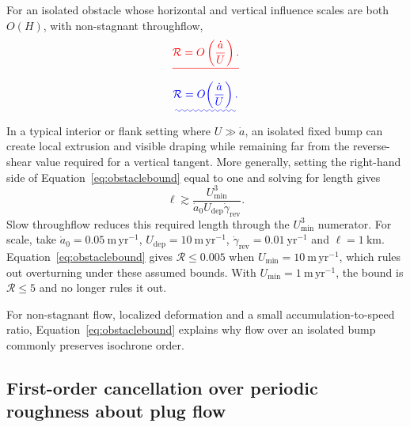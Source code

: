 \documentclass[review]{igs}
\providecommand{\DIFadd}[1]{{\protect\color{blue}\uwave{#1}}} %
\providecommand{\DIFdel}[1]{{\protect\color{red}\sout{#1}}}                      %
\providecommand{\DIFaddbegin}{} %
\providecommand{\DIFaddend}{} %
\providecommand{\DIFdelbegin}{} %
\providecommand{\DIFdelend}{} %
\newcommand{\DIFscaledelfig}{0.5}
\newlength{\DIFdelgraphicswidth} %
\newlength{\DIFdelgraphicsheight} %
\newcommand{\DIFaddincludegraphics}[2][]{{\color{blue}\fbox{\DIFOincludegraphics[#1]{#2}}}} %
\newcommand{\DIFdelincludegraphics}[2][]{%
\sbox{\DIFdelgraphicsbox}{\DIFOincludegraphics[#1]{#2}}%
\settoboxwidth{\DIFdelgraphicswidth}{\DIFdelgraphicsbox} %
\settoboxtotalheight{\DIFdelgraphicsheight}{\DIFdelgraphicsbox} %
\scalebox{\DIFscaledelfig}{%
\parbox[b]{\DIFdelgraphicswidth}{\usebox{\DIFdelgraphicsbox}\\[-\baselineskip] \rule{\DIFdelgraphicswidth}{0em}}\llap{\resizebox{\DIFdelgraphicswidth}{\DIFdelgraphicsheight}{%
\setlength{\unitlength}{\DIFdelgraphicswidth}%
\begin{picture}(1,1)%
\thicklines\linethickness{2pt} %
{\color[rgb]{1,0,0}\put(0,0){\framebox(1,1){}}}%
{\color[rgb]{1,0,0}\put(0,0){\line( 1,1){1}}}%
{\color[rgb]{1,0,0}\put(0,1){\line(1,-1){1}}}%
\end{picture}%
}\hspace*{3pt}}} %
} %
\DeclareRobustCommand{\DIFaddbegin}{\DIFOaddbegin \let\includegraphics\DIFaddincludegraphics} %
\DeclareRobustCommand{\DIFaddend}{\DIFOaddend \let\includegraphics\DIFOincludegraphics} %
\DeclareRobustCommand{\DIFdelbegin}{\DIFOdelbegin \let\includegraphics\DIFdelincludegraphics} %
\DeclareRobustCommand{\DIFdelend}{\DIFOaddend \let\includegraphics\DIFOincludegraphics} %
\begin{document}
For an isolated obstacle whose horizontal and vertical influence scales are both \(O(H)\), with non-stagnant throughflow,
\DIFdelbegin \begin{displaymath}
\DIFdel{\mathcal{R}=O\left(\frac{\dot a}{U}\right).
}\end{displaymath}%
\DIFdelend \DIFaddbegin \begin{equation}
\DIFadd{\mathcal{R}=O\!\left(\frac{\dot a}{U}\right).
\label{eq:isolatedscale}
}\end{equation}\DIFaddend 
In a typical interior or flank setting where \(U\gg\dot a\), an isolated fixed bump can create local extrusion and visible draping while remaining far from the reverse-shear value required for a vertical tangent. More generally, setting the right-hand side of Equation~\ref{eq:obstaclebound} equal to one and solving for length gives
\begin{equation}
\ell
\gtrsim
\frac{U_{\min}^{3}}{\dot a_0U_{\mathrm{dep}}\dot\gamma_{\mathrm{rev}}}.
\label{eq:lengththreshold}
\end{equation}
Slow throughflow reduces this required length through the \(U_{\min}^{3}\) numerator. For scale, take \(\dot a_0=0.05~\mathrm{m\,yr^{-1}}\), \(U_{\mathrm{dep}}=10~\mathrm{m\,yr^{-1}}\), \(\dot\gamma_{\mathrm{rev}}=0.01~\mathrm{yr^{-1}}\) and \(\ell=1~\mathrm{km}\). Equation~\ref{eq:obstaclebound} gives \(\mathcal{R}\leq0.005\) when \(U_{\min}=10~\mathrm{m\,yr^{-1}}\), which rules out overturning under these assumed bounds. With \(U_{\min}=1~\mathrm{m\,yr^{-1}}\), the bound is \(\mathcal{R}\leq5\) and no longer rules it out.

For non-stagnant flow, localized deformation and a small accumulation-to-speed ratio, Equation~\ref{eq:obstaclebound} explains why flow over an isolated bump commonly preserves isochrone order.

\subsection{First-order cancellation over periodic roughness about plug flow}
\end{document}
